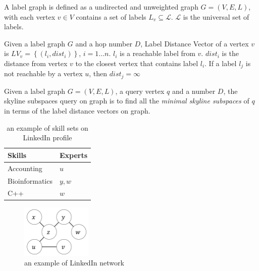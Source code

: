 \begin{definition}
A label graph is defined as a undirected and unweighted graph $G = (V, E, L)$, with each vertex $v \in V$ contains a set of labels $L_v \subseteq \mathcal{L}$. $\mathcal{L}$ is the universal set of labels.
\end{definition}

\begin{definition}
Given a label graph $G$ and a hop number $D$, Label Distance Vector of a vertex $v$ is $LV_v=\left\{\left(l_i, dist_i\right)\right\}$, $i = 1 \ldots n$. $l_i$ is a reachable label from $v$. $dist_i$ is the distance from vertex $v$ to the closest vertex that contains label $l_i$. If a label $l_j$ is not reachable by a vertex $u$, then $dist_j = \infty$
\end{definition}

\begin{definition}
Given a label graph $G = (V, E, L)$, a query vertex $q$ and a number $D$, the skyline subspaces query on graph is to find all the \emph{minimal skyline subspaces} of $q$ in terms of the label distance vectors on graph.
\end{definition}

\begin{table}[h]
    \centering
    \begin{tabular}{|l|l|}
    \hline
    Skills         & Experts \\ \hline
    Accounting     & $u$     \\ \hline
    Bioinformatics & $y, w$  \\ \hline
    C++            & $w$     \\ \hline
    \end{tabular}
    \caption{\label{tab:skill_sets}an example of skill sets on LinkedIn profile}
\end{table}
    
\begin{figure}[h]
    \centering
    \includegraphics[width=0.3\textwidth]{figs/graph_example}
    \caption{\label{fig:graph}an example of LinkedIn network}
    
\end{figure}

